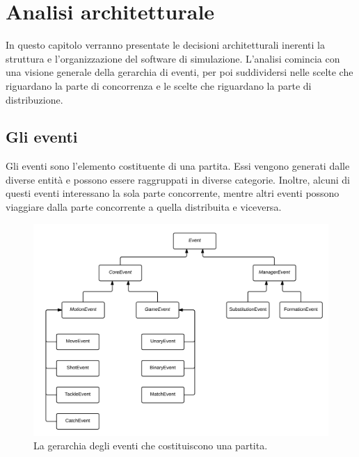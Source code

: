 
\section{Analisi architetturale}
\label{sec:analisi_architetturale}

In questo capitolo verranno presentate le decisioni architetturali inerenti la struttura e l'organizzazione del software di simulazione. L'analisi comincia con una visione generale della gerarchia di eventi, per poi suddividersi nelle scelte che riguardano la parte di concorrenza e le scelte che riguardano la parte di distribuzione.

\subsection{Gli eventi}
\label{sec:analisi_eventi}

Gli eventi sono l'elemento costituente di una partita. Essi vengono generati dalle diverse entità e possono essere raggruppati in diverse categorie. Inoltre, alcuni di questi eventi interessano la sola parte concorrente, mentre altri eventi possono viaggiare dalla parte concorrente a quella distribuita e viceversa.

\begin{figure}[htp!]
	\centering
	\includegraphics[scale=.2]{images/event_hierarchy.png}
	\caption{La gerarchia degli eventi che costituiscono una partita.}
	\label{fig:event_hierarchy}
\end{figure}

